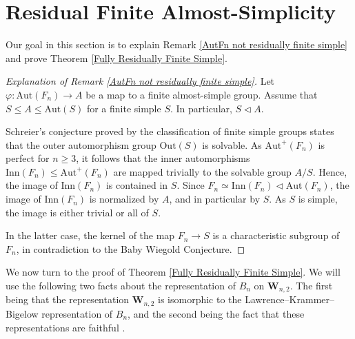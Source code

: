 \documentclass[letterpaper]{amsart}
\begin{document}
\section{Residual Finite Almost-Simplicity}
\label{Section on residual finite almost-simplicity}
Our goal in this section is to explain Remark \ref{AutFn not residually finite simple} and prove Theorem \ref{Fully Residually Finite Simple}.

\begin{proof}[Explanation of Remark \ref{AutFn not residually finite simple}]
Let $\varphi: \mathrm{Aut}(F_n) \to A$ be a map to a finite almost-simple group. Assume that $S \leq A \leq \mathrm{Aut}(S)$ for a finite simple $S$. In particular, $S \lhd A$.

Schreier's conjecture proved by the classification of finite simple groups states that the outer automorphism group $\mathrm{Out}(S)$ is solvable. As $\mathrm{Aut}^+(F_n)$ is perfect for $n \geq 3$, it follows that the inner automorphisms $\mathrm{Inn}(F_n) \leq \mathrm{Aut}^+(F_n)$ are mapped trivially to the solvable group $A / S.$ Hence, the image of $\mathrm{Inn}(F_n)$ is contained in $S$. Since $F_n \simeq \mathrm{Inn}(F_n) \lhd \mathrm{Aut}(F_n)$, the image of $\mathrm{Inn}(F_n)$ is normalized by $A$, and in particular by $S$. As $S$ is simple, the image is either trivial or all of $S$.

In the latter case, the kernel of the map $F_n \to S$ is a characteristic subgroup of $F_n$, in contradiction to the Baby Wiegold Conjecture.
\end{proof}
We now turn to the proof of Theorem \ref{Fully Residually Finite Simple}. We will use the following two facts about the representation of $B_n$ on $\textbf{W}_{n, 2}$. The first being \cite[Theorem 2]{jackson2011lawrence} that the representation $\textbf{W}_{n, 2}$ is isomorphic to the Lawrence--Krammer--Bigelow representation of $B_n$, and the second being the fact that these representations are faithful \cite{bigelow2001braid}.
\end{document}
